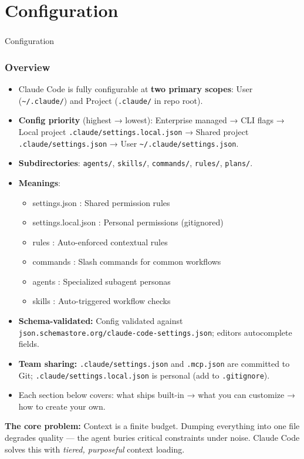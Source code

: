 \section{Configuration}
\begin{frame}[fragile]\frametitle{}

\begin{center}
{\Large Configuration}
\end{center}
\end{frame}


\begin{frame}[fragile]\frametitle{Overview}
  \begin{itemize}
    \item Claude Code is fully configurable at \textbf{two primary scopes}: User (\texttt{\textasciitilde/.claude/}) and Project (\texttt{.claude/} in repo root).
    \item \textbf{Config priority} (highest → lowest): Enterprise managed → CLI flags → Local project \texttt{.claude/settings.local.json} → Shared project \texttt{.claude/settings.json} → User \texttt{\textasciitilde/.claude/settings.json}.
    \item \textbf{Subdirectories}: \texttt{agents/}, \texttt{skills/}, \texttt{commands/}, \texttt{rules/}, \texttt{plans/}.
	\item \textbf{Meanings}:
	  \begin{itemize}
			\item settings.json : Shared permission rules
			\item settings.local.json : Personal permissions (gitignored)
			\item rules  : Auto-enforced contextual rules
			\item commands  : Slash commands for common workflows
			\item agents  : Specialized subagent personas
			\item skills  :  Auto-triggered workflow checks
      \end{itemize}
    \item \textbf{Schema-validated:} Config validated against \texttt{json.schemastore.org/claude-code-settings.json}; editors autocomplete fields.
    \item \textbf{Team sharing:} \texttt{.claude/settings.json} and \texttt{.mcp.json} are committed to Git; \texttt{.claude/settings.local.json} is personal (add to \texttt{.gitignore}).
    \item Each section below covers: what ships built-in → what you can customize → how to create your own.
  \end{itemize}

\textbf{The core problem:} Context is a finite budget. Dumping everything into one file degrades quality --- the agent buries critical constraints under noise. Claude Code solves this with \textit{tiered, purposeful} context loading.
\end{frame}


